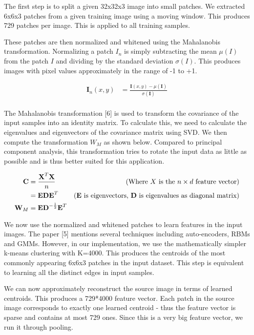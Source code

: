 \documentclass{article} %
\begin{document}
        The first step is to split a given 32x32x3 image into small patches. We extracted 6x6x3 patches from a given training image using a moving window. This produces 729 patches per image. This is applied to all training samples.

        These patches are then normalized and whitened using the Mahalanobis transformation. Normalizing a patch $I_n$ is simply subtracting the mean $\mu(I)$ from the patch $I$ and dividing by the standard deviation $\sigma(I)$. This produces images with pixel values approximately in the range of -1 to +1.
        
        \begin{align*}
            \textbf{I}_{n}(x, y) &= \frac{\textbf{I}(x, y) - \mu(\textbf{I})}{\sigma(\textbf{I})}\\
        \end{align*}

        The Mahalanobis transformation [6] is used to transform the covariance of the input samples into an identity matrix. To calculate this, we need to calculate the eigenvalues and eigenvectors of the covariance matrix using SVD. We then compute the transformation \textbf{$W_{M}$} as shown below. Compared to principal component analysis, this transformation tries to rotate the input data as little as possible and is thus better suited for this application.

        \begin{align*}
            \textbf{C} &= \frac{\textbf{X}^{T}\textbf{X}}{n} & \text{(Where $X$ is the $n\times d$ feature vector)}\\
            &= \textbf{EDE}^{T} & \text{(\textbf{E} is eigenvectors, \textbf{D} is eigenvalues as diagonal matrix)}\\
            \textbf{W}_{M} &= \textbf{ED}^{-\frac{1}{2}}\textbf{E}^{T}\\
        \end{align*}

        We now use the normalized and whitened patches to learn features in the input images. The paper [5] mentions several techniques including auto-encoders, RBMs and GMMs. However, in our implementation, we use the mathematically simpler k-means clustering with K=4000. This produces the centroids of the most commonly appearing 6x6x3 patches in the input dataset. This step is equivalent to learning all the distinct edges in input samples.

        We can now approximately reconstruct the source image in terms of learned centroids. This produces a 729*4000 feature vector. Each patch in the source image corresponds to exactly one learned centroid - thus the feature vector is sparse and contains at most 729 ones. Since this is a very big feature vector, we run it through pooling.
\end{document}

